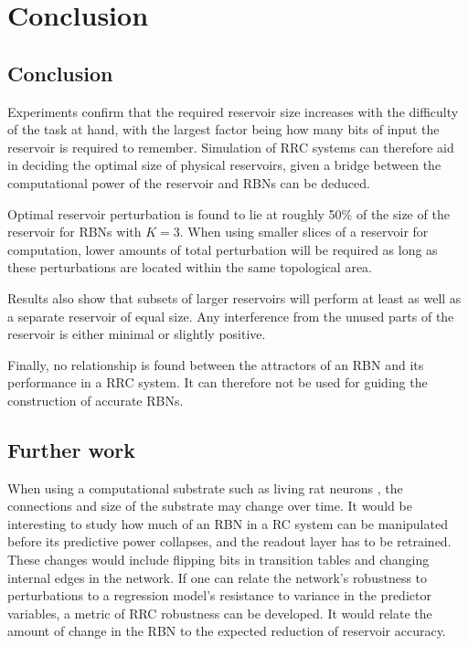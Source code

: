 \chapter{Conclusion}
\label{chapter:conclusion}

\section{Conclusion}

Experiments confirm that the required reservoir size increases with the difficulty of the task at hand,
with the largest factor being how many bits of input the reservoir is required to remember.
Simulation of RRC systems can therefore aid in deciding the optimal size of physical reservoirs,
given a bridge between the computational power of the reservoir and RBNs can be deduced.

Optimal reservoir perturbation is found to lie at roughly 50\% of the size of the reservoir for RBNs with $K=3$.
When using smaller slices of a reservoir for computation,
lower amounts of total perturbation will be required as long as these perturbations are located within the same topological area.

Results also show that subsets of larger reservoirs will perform at least as well as a separate reservoir of equal size.
Any interference from the unused parts of the reservoir is either minimal or slightly positive.

Finally, no relationship is found between the attractors of an RBN and its performance in a RRC system.
It can therefore not be used for guiding the construction of accurate RBNs.

\section{Further work}

When using a computational substrate such as living rat neurons \cite{demarse2005adaptive},
the connections and size of the substrate may change over time.
It would be interesting to study how much of an RBN in a RC system can be manipulated before its predictive power collapses,
and the readout layer has to be retrained.
These changes would include flipping bits in transition tables and changing internal edges in the network.
If one can relate the network's robustness to perturbations to a regression model's resistance to variance in the predictor variables,
a metric of RRC robustness can be developed.
It would relate the amount of change in the RBN to the expected reduction of reservoir accuracy.

